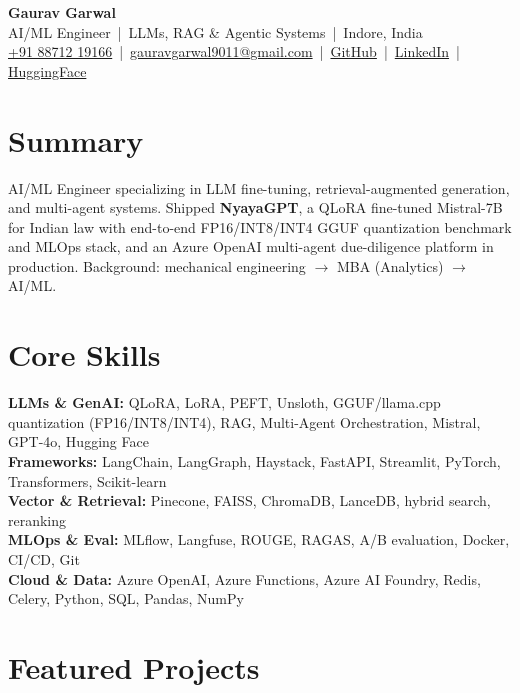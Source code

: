 \documentclass[11pt,a4paper]{article}
\begin{document}
\begin{center}
    {\LARGE \textbf{Gaurav Garwal}} \\
    AI/ML Engineer \,|\, LLMs, RAG \& Agentic Systems \,|\, Indore, India \\
    \href{tel:+918871219166}{+91 88712 19166} \,|\,
    \href{mailto:gauravgarwal9011@gmail.com}{gauravgarwal9011@gmail.com} \,|\,
    \href{https://www.github.com/gauravgarwal9011}{GitHub} \,|\,
    \href{https://www.linkedin.com/in/gauravgarwal/}{LinkedIn} \,|\,
    \href{https://huggingface.co/gauravgarwal/NyayaGPT-Mistral7B-adapter}{HuggingFace}
\end{center}

\section*{Summary}
AI/ML Engineer specializing in LLM fine-tuning, retrieval-augmented generation, and multi-agent systems. Shipped \textbf{NyayaGPT}, a QLoRA fine-tuned Mistral-7B for Indian law with end-to-end FP16/INT8/INT4 GGUF quantization benchmark and MLOps stack, and an Azure OpenAI multi-agent due-diligence platform in production. Background: mechanical engineering $\rightarrow$ MBA (Analytics) $\rightarrow$ AI/ML.

\section*{Core Skills}
\textbf{LLMs \& GenAI:} QLoRA, LoRA, PEFT, Unsloth, GGUF/llama.cpp quantization (FP16/INT8/INT4), RAG, Multi-Agent Orchestration, Mistral, GPT-4o, Hugging Face \\
\textbf{Frameworks:} LangChain, LangGraph, Haystack, FastAPI, Streamlit, PyTorch, Transformers, Scikit-learn \\
\textbf{Vector \& Retrieval:} Pinecone, FAISS, ChromaDB, LanceDB, hybrid search, reranking \\
\textbf{MLOps \& Eval:} MLflow, Langfuse, ROUGE, RAGAS, A/B evaluation, Docker, CI/CD, Git \\
\textbf{Cloud \& Data:} Azure OpenAI, Azure Functions, Azure AI Foundry, Redis, Celery, Python, SQL, Pandas, NumPy

\section*{Featured Projects}
\end{document}

